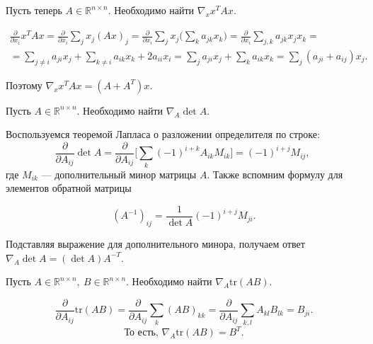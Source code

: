 \documentclass[12pt,fleqn]{article}
\begin{document}
\begin{vkProblem} Пусть теперь $A \in \mathbb{R}^{n\times n}$. Необходимо найти $\nabla_x x^TAx$.
\end{vkProblem} 
    
\begin{esSolution}
\begin{multline*}
    \frac{\partial}{\partial x_i} x^TAx = \frac{\partial}{\partial x_i}\sum_j x_j (Ax)_j = \frac{\partial}{\partial x_i}\sum_j x_j \bigg(\sum_k a_{jk}x_k\bigg) = \frac{\partial}{\partial x_i}\sum_{j,k} a_{jk} x_j x_k = \\
 = \sum_{j \neq i} a_{ji} x_j + \sum_{k \neq i} a_{ik} x_k + 2a_{ii}x_i = \sum_{j} a_{ji} x_j + \sum_{k} a_{ik} x_k = \sum_{j} (a_{ji} + a_{ij}) x_j.
\end{multline*}
    
Поэтому $\nabla_x x^TAx = (A + A^T)x$.
    
\end{esSolution}
    
\begin{vkProblem} Пусть $A \in \mathbb{R}^{n\times n}$. Необходимо найти $\nabla_A \det A$.
\end{vkProblem}
    
\begin{esSolution} Воспользуемся теоремой Лапласа о разложении определителя по строке:
    \[\frac{\partial}{\partial A_{ij}} \det A = \frac{\partial}{\partial A_{ij}}\bigg[\sum_k (-1)^{i+k}A_{ik}M_{ik}\bigg] = (-1)^{i+j}M_{ij}, \; \]
где $M_{ik}$ --- дополнительный минор матрицы $A$. Также вспомним формулу для элементов обратной матрицы
    
    \[(A^{-1})_{ij} = \frac{1}{\det A}(-1)^{i+j}M_{ji}.\]
    
    Подставляя выражение для дополнительного минора, получаем ответ $\nabla_A \det A = (\det A) A^{-T}$.
\end{esSolution}

\newpage 
\begin{vkProblem} Пусть $A \in \mathbb{R}^{n \times n},\ B \in \mathbb{R}^{n \times n}$. Необходимо найти $\nabla_A \text{tr}(AB)$. 
\end{vkProblem}

\begin{esSolution}
    
\[
\frac{\partial}{\partial A_{ij}} \text{tr}(AB) = \frac{\partial}{\partial A_{ij}} \sum_k (AB)_{kk} = \frac{\partial}{\partial A_{ij}} \sum_{k,l} A_{kl}B_{lk} = B_{ji}.
\]
\[
\text{То есть, }\nabla_A \text{tr}(AB) = B^T.
\]

\end{esSolution}
\end{document}
